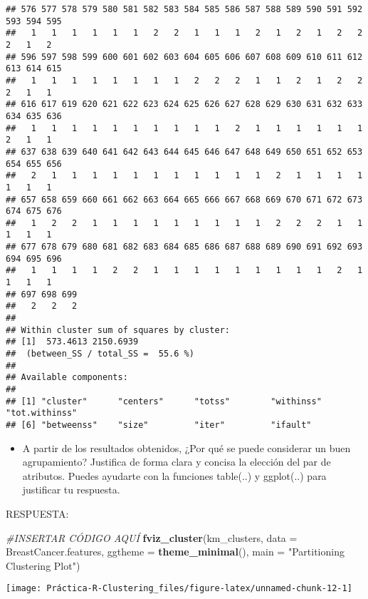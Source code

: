 \documentclass[
]{article}
\newenvironment{Shaded}{\begin{snugshade}}{\end{snugshade}}
\newcommand{\CommentTok}[1]{\textcolor[rgb]{0.56,0.35,0.01}{\textit{#1}}}
\newcommand{\DataTypeTok}[1]{\textcolor[rgb]{0.13,0.29,0.53}{#1}}
\newcommand{\KeywordTok}[1]{\textcolor[rgb]{0.13,0.29,0.53}{\textbf{#1}}}
\newcommand{\NormalTok}[1]{#1}
\newcommand{\StringTok}[1]{\textcolor[rgb]{0.31,0.60,0.02}{#1}}
\providecommand{\tightlist}{%
  \setlength{\itemsep}{0pt}\setlength{\parskip}{0pt}}
\begin{document}
\begin{verbatim}
## 576 577 578 579 580 581 582 583 584 585 586 587 588 589 590 591 592 593 594 595 
##   1   1   1   1   1   1   2   2   1   1   1   2   1   2   1   2   2   2   1   2 
## 596 597 598 599 600 601 602 603 604 605 606 607 608 609 610 611 612 613 614 615 
##   1   1   1   1   1   1   1   1   2   2   2   1   1   2   1   2   2   2   1   1 
## 616 617 619 620 621 622 623 624 625 626 627 628 629 630 631 632 633 634 635 636 
##   1   1   1   1   1   1   1   1   1   1   2   1   1   1   1   1   1   2   1   1 
## 637 638 639 640 641 642 643 644 645 646 647 648 649 650 651 652 653 654 655 656 
##   2   1   1   1   1   1   1   1   1   1   1   1   2   1   1   1   1   1   1   1 
## 657 658 659 660 661 662 663 664 665 666 667 668 669 670 671 672 673 674 675 676 
##   1   2   2   1   1   1   1   1   1   1   1   1   2   2   2   1   1   1   1   1 
## 677 678 679 680 681 682 683 684 685 686 687 688 689 690 691 692 693 694 695 696 
##   1   1   1   1   2   2   1   1   1   1   1   1   1   1   1   2   1   1   1   1 
## 697 698 699 
##   2   2   2 
## 
## Within cluster sum of squares by cluster:
## [1]  573.4613 2150.6939
##  (between_SS / total_SS =  55.6 %)
## 
## Available components:
## 
## [1] "cluster"      "centers"      "totss"        "withinss"     "tot.withinss"
## [6] "betweenss"    "size"         "iter"         "ifault"
\end{verbatim}

\begin{itemize}
\tightlist
\item
  A partir de los resultados obtenidos, ¿Por qué se puede considerar un
  buen agrupamiento? Justifica de forma clara y concisa la elección del
  par de atributos. Puedes ayudarte con la funciones table(..) y
  ggplot(..) para justificar tu respuesta.
\end{itemize}

RESPUESTA:

\begin{Shaded}
\begin{Highlighting}[]
\CommentTok{#INSERTAR CÓDIGO AQUÍ}
\KeywordTok{fviz_cluster}\NormalTok{(km_clusters, }\DataTypeTok{data =}\NormalTok{ BreastCancer.features,}
             \DataTypeTok{ggtheme =} \KeywordTok{theme_minimal}\NormalTok{(),}
             \DataTypeTok{main =} \StringTok{"Partitioning Clustering Plot"}\NormalTok{)}
\end{Highlighting}
\end{Shaded}

\begin{center}\texttt{[image: Práctica-R-Clustering\_files/figure-latex/unnamed-chunk-12-1]} \end{center}
\end{document}
